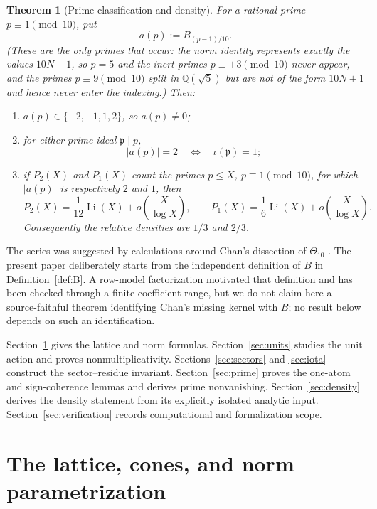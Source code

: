 \documentclass[12pt]{amsart}
\newtheorem{theorem}{Theorem}[section]
\theoremstyle{definition}
\theoremstyle{remark}
\newcommand{\QQ}{\mathbb{Q}}
\begin{document}
\begin{theorem}[Prime classification and density]\label{thm:main}
For a rational prime $p\equiv1\pmod{10}$, put
\[
  a(p):=B_{(p-1)/10}.
\]
(These are the only primes that occur: the norm identity represents
exactly the values $10N+1$, so $p=5$ and the inert primes
$p\equiv\pm3\pmod{10}$ never appear, and the primes
$p\equiv9\pmod{10}$ split in $\QQ(\sqrt5)$ but are not of the form
$10N+1$ and hence never enter the indexing.)
Then:
\begin{enumerate}
\item $a(p)\in\{-2,-1,1,2\}$, so $a(p)\neq0$;
\item for either prime ideal $\mathfrak p\mid p$,
\[
  |a(p)|=2\quad\Longleftrightarrow\quad
  \iota(\mathfrak p)=1;
\]
\item if $P_2(X)$ and $P_1(X)$ count the primes $p\leq X$,
$p\equiv1\pmod{10}$, for which $|a(p)|$ is respectively $2$ and $1$,
then
\[
  P_2(X)=\frac1{12}\operatorname{Li}(X)
    +o\!\left(\frac{X}{\log X}\right),
  \qquad
  P_1(X)=\frac16\operatorname{Li}(X)
    +o\!\left(\frac{X}{\log X}\right).
\]
Consequently the relative densities are $1/3$ and $2/3$.
\end{enumerate}
\end{theorem}

The series was suggested by calculations around Chan's dissection of
$\Theta_{10}$ \cite{jCh10,oCh11}.  The present paper deliberately
starts from the independent definition of $B$ in
Definition~\ref{def:B}.  A row-model factorization motivated that
definition and has been checked through a finite coefficient range,
but we do not claim here a source-faithful theorem identifying Chan's
missing kernel with $B$; no result below depends on such an
identification.

Section~\ref{sec:algebra} gives the lattice and norm formulas.
Section~\ref{sec:units} studies the unit action and proves
nonmultiplicativity.  Sections~\ref{sec:sectors} and \ref{sec:iota}
construct the sector--residue invariant.  Section~\ref{sec:prime}
proves the one-atom and sign-coherence lemmas and derives prime
nonvanishing.  Section~\ref{sec:density} derives the density statement
from its explicitly isolated analytic input.
Section~\ref{sec:verification} records computational and formalization
scope.

\section{The lattice, cones, and norm parametrization}
\label{sec:algebra}
\end{document}
